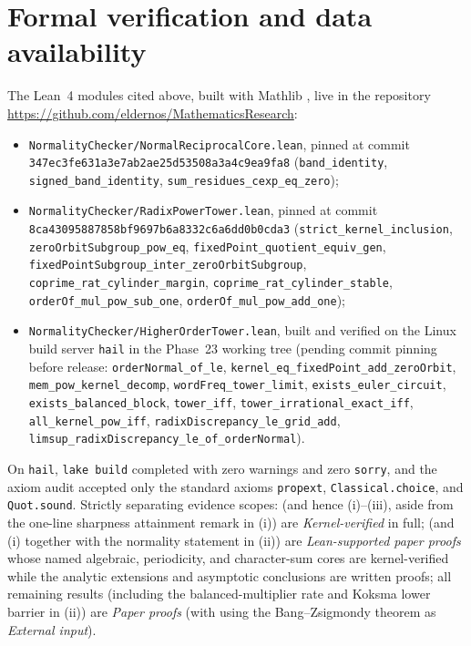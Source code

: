 \documentclass[11pt]{article}
\newcommand{\ttt}[1]{\texttt{#1}}
\newcommand{\phaseXXIcommit}{347ec3fe631a3e7ab2ae25d53508a3a4c9ea9fa8}
\newcommand{\phaseXXIIcommit}{8ca43095887858bf9697b6a8332c6a6dd0b0cda3}
\begin{document}
\section{Formal verification and data availability}\label{sec:formal}

The Lean~4 \cite{Lean4} modules cited above, built with Mathlib \cite{Mathlib}, live in the repository \url{https://github.com/eldernos/MathematicsResearch}:
\begin{itemize}[nosep]
\item \ttt{NormalityChecker/NormalReciprocalCore.lean}, pinned at commit \ttt{\phaseXXIcommit} (\ttt{band\_identity}, \ttt{signed\_band\_identity}, \ttt{sum\_residues\_cexp\_eq\_zero});
\item \ttt{NormalityChecker/RadixPowerTower.lean}, pinned at commit \ttt{\phaseXXIIcommit} (\ttt{strict\_kernel\_inclusion}, \ttt{zeroOrbitSubgroup\_pow\_eq}, \ttt{fixedPoint\_quotient\_equiv\_gen}, \ttt{fixedPointSubgroup\_inter\_zeroOrbitSubgroup}, \ttt{coprime\_rat\_cylinder\_margin}, \ttt{coprime\_rat\_cylinder\_stable}, \ttt{orderOf\_mul\_pow\_sub\_one}, \ttt{orderOf\_mul\_pow\_add\_one});
\item \ttt{NormalityChecker/HigherOrderTower.lean}, built and verified on the Linux build server \ttt{hail} in the Phase~23 working tree (pending commit pinning before release: \ttt{orderNormal\_of\_le}, \ttt{kernel\_eq\_fixedPoint\_add\_zeroOrbit}, \ttt{mem\_pow\_kernel\_decomp}, \ttt{wordFreq\_tower\_limit}, \ttt{exists\_euler\_circuit}, \ttt{exists\_balanced\_block}, \ttt{tower\_iff}, \ttt{tower\_irrational\_exact\_iff}, \ttt{all\_kernel\_pow\_iff}, \ttt{radixDiscrepancy\_le\_grid\_add}, \ttt{limsup\_radixDiscrepancy\_le\_of\_orderNormal}).
\end{itemize}
On \ttt{hail}, \ttt{lake build} completed with zero warnings and zero \ttt{sorry}, and the axiom audit accepted only the standard axioms \ttt{propext}, \ttt{Classical.choice}, and \ttt{Quot.sound}. Strictly separating evidence scopes:  (and hence (i)--(iii), aside from the one-line sharpness attainment remark in (i)) are \emph{Kernel-verified} in full;  (and (i) together with the normality statement in (ii)) are \emph{Lean-supported paper proofs} whose named algebraic, periodicity, and character-sum cores are kernel-verified while the analytic extensions and asymptotic conclusions are written proofs; all remaining results (including the balanced-multiplier rate and Koksma lower barrier in (ii)) are \emph{Paper proofs} (with  using the Bang--Zsigmondy theorem \cite{Bang1886,Zsigmondy1892} as \emph{External input}).
\end{document}
